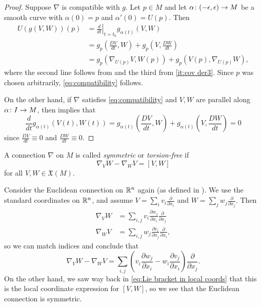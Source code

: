 \begin{proof}
	Suppose $\nabla$ is compatible with $g$. Let $p \in M$ and let $\alpha \colon\thinspace\! (-\epsilon,\epsilon) \to M$ be a smooth curve with $\alpha(0) = p$ and $\alpha'(0) = U(p)$. Then
	\begin{align*}
		U(g(V,W))(p) & = \left. \frac{d}{dt} \right|_{t=t_0} g_{\alpha(t)}(V,W) \\
		& = g_p\left(\frac{DV}{dt},W\right) + g_p\left(V,\frac{DW}{dt}\right) \\
		& = g_p(\nabla_{U(p)}V,W(p)) + g_p(V(p),\nabla_{U(p)}W),
	\end{align*}
	where the second line follows from  and the third from \ref{it:cov der3}. Since $p$ was chosen arbitrarily, \eqref{eq:compatibility} follows.
	
	On the other hand, if $\nabla$ satisfies \eqref{eq:compatibility} and $V,W$ are parallel along $\alpha \colon\thinspace\! I \to M$, then  implies that
	\[
		\frac{d}{dt} g_{\alpha(t)}(V(t),W(t)) = g_{\alpha(t)} \left(\frac{DV}{dt},W\right) + g_{\alpha(t)} \left(V,\frac{DW}{dt}\right) = 0
	\]
	since $\frac{DV}{dt} \equiv 0$ and $\frac{DW}{dt} \equiv 0$.
\end{proof}

\begin{definition}\label{def:symmetric connection}
	A connection $\nabla$ on $M$ is called \emph{symmetric} or \emph{torsion-free} if 
	\[
		\nabla_V W - \nabla_W V = [V,W]
	\]
	for all $V,W \in \mathfrak{X}(M)$.
\end{definition}

\begin{example}
	Consider the Euclidean connection on $\mathbb{R}^n$ again (as defined in ). We use the standard coordinates on $\mathbb{R}^n$, and assume $V = \sum_i v_i \frac{\partial}{\partial x_i}$ and $W = \sum_j w_j \frac{\partial}{\partial x_j}$. Then
	\begin{align*}
		\nabla_VW & = \sum_{i,j} v_i \frac{\partial w_j}{\partial x_i} \frac{\partial}{\partial x_j} \\
		\nabla_WV & = \sum_{i,j} w_j \frac{\partial v_i}{\partial x_j} \frac{\partial}{\partial x_i},
	\end{align*}
	so we can match indices and conclude that
	\[
		\nabla_VW - \nabla_WV = \sum_{i,j} \left(v_i \frac{\partial w_j}{\partial x_i} - w_i \frac{\partial v_j}{\partial x_i}\right) \frac{\partial}{\partial x_j}.
	\]
	On the other hand, we saw way back in \eqref{eq:Lie bracket in local coords} that this is the local coordinate expression for $[V,W]$, so we see that the Euclidean connection is symmetric.
\end{example}

